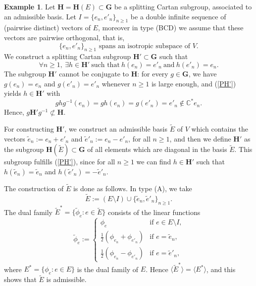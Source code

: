 \documentclass[12pt]{amsart}
\newcommand{\G}{\mathbf{G}}
\renewcommand{\H}{\mathbf{H}}
\newcommand{\C}{\mathbb{C}}
\numberwithin{equation}{section}
\theoremstyle{definition}
\newtheorem{example}[theorem]{Example}
\begin{document}
\begin{example}
\label{E2}
Let $\H=\H(E)\subset \G$ be a splitting Cartan subgroup, associated to an admissible basis. Let $I=\{e_n,e'_n\}_{n\geq 1}$ be a double infinite sequence of (pairwise distinct) vectors of $E$, moreover in type (BCD) we assume that these vectors are pairwise orthogonal, that is,
\begin{equation}
\label{Iisotropic}
\mbox{$\{e_n,e'_n\}_{n\geq 1}$ spans an isotropic subspace of $V$.}
\end{equation}
We construct a splitting Cartan subgroup $\H'\subset\G$ such that
\begin{equation}
\label{PH'}
\forall n\geq 1,\ \exists h\in\H'\ \mbox{such that}\ h(e_n)=e'_n\ \mbox{and}\ h(e'_n)=e_n.
\end{equation}
The subgroup $\H'$ cannot be conjugate to $\H$: for every $g\in\G$, we have $g(e_n)=e_n$ and $g(e'_n)=e'_n$ whenever $n\geq 1$ is large enough,
and (\ref{PH'}) yields $h\in\H'$ with
\[ghg^{-1}(e_n)=gh(e_n)=g(e'_n)=e'_n\notin\C^*e_n.\]
Hence, $g\H'g^{-1}\not\subset\H$.

For constructing $\H'$, we construct an admissible basis $\tilde{E}$ of $V$ which contains the vectors $\tilde{e}_n:=e_n+e'_n$ and $\tilde{e}'_n:=e_n-e'_n$, for all $n\geq 1$, and then we define $\H'$ as the subgroup $\H(\tilde{E})\subset\G$ of all elements which are diagonal in the basis $\tilde{E}$. This subgroup fulfills (\ref{PH'}),
since for all $n\geq 1$ we can find $h\in\H'$
such that $h(\tilde{e}_n)=\tilde{e}_n$ and $h(\tilde{e}'_n)=-\tilde{e}'_n$.

The construction of $\tilde{E}$ is done as follows. In type (A), we take
\[
\tilde{E}:=(E\setminus I)\cup \{\tilde{e}_n,\tilde{e}'_n\}_{n\geq 1}.
\]
The dual family $\tilde{E}^*=\{\tilde\phi_e:e\in \tilde{E}\}$ consists of the linear functions
\[
\tilde\phi_e:=\left\{\begin{array}{ll}
\phi_e & \mbox{if $e\in E\setminus I$,} \\
\frac{1}{2}(\phi_{e_n}+\phi_{e'_n}) & \mbox{if $e=\tilde{e}_n$,} \\
\frac{1}{2}(\phi_{e_n}-\phi_{e'_n}) & \mbox{if $e=\tilde{e}'_n$,}
\end{array}\right.
\]
where $E^*=\{\phi_e:e\in E\}$ is the dual family of $E$. Hence $\langle \tilde{E}^*\rangle=\langle E^*\rangle$, and this shows that $\tilde{E}$ is admissible.


\end{example}
\end{document}
